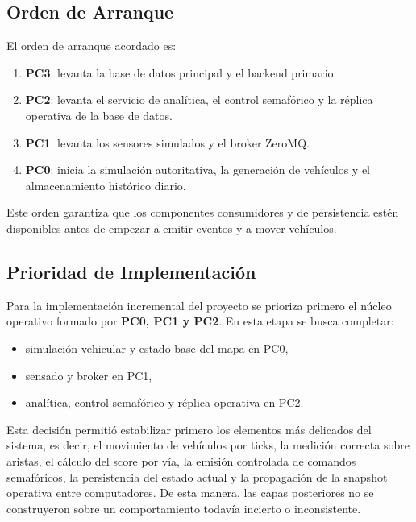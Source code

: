 \documentclass[12pt, a4paper]{article}
\begin{document}
\subsection{Orden de Arranque}

El orden de arranque acordado es:

\begin{enumerate}
    \item \textbf{PC3}: levanta la base de datos principal y el backend primario.
    \item \textbf{PC2}: levanta el servicio de analítica, el control semafórico y la réplica operativa de la base de datos.
    \item \textbf{PC1}: levanta los sensores simulados y el broker ZeroMQ.
    \item \textbf{PC0}: inicia la simulación autoritativa, la generación de vehículos y el almacenamiento histórico diario.
\end{enumerate}

Este orden garantiza que los componentes consumidores y de persistencia estén disponibles antes de empezar a emitir eventos y a mover vehículos.

\subsection{Prioridad de Implementación}

Para la implementación incremental del proyecto se prioriza primero el núcleo operativo formado por \textbf{PC0, PC1 y PC2}. En esta etapa se busca completar:

\begin{itemize}
    \item simulación vehicular y estado base del mapa en PC0,
    \item sensado y broker en PC1,
    \item analítica, control semafórico y réplica operativa en PC2.
\end{itemize}
Esta decisión permitió estabilizar primero los elementos más delicados del sistema, es decir, 
el movimiento de vehículos por ticks, la medición correcta sobre aristas, el cálculo del
score por vía, la emisión controlada de comandos semafóricos, la persistencia del estado
actual y la propagación de la snapshot operativa entre computadores. De esta manera,
las capas posteriores no se construyeron sobre un comportamiento todavía incierto o
inconsistente.
\end{document}

